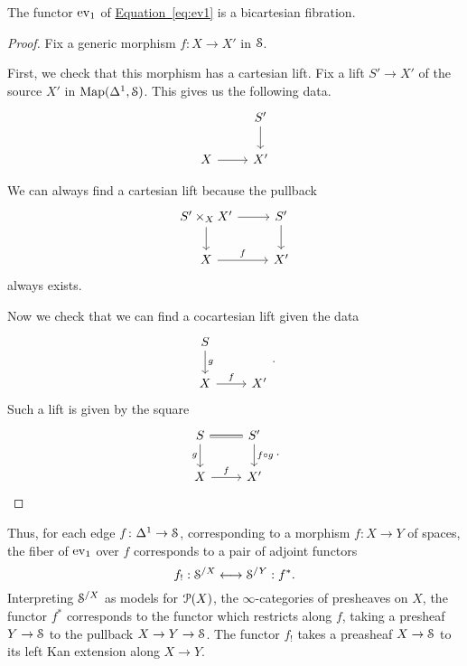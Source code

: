\documentclass[main.tex]{subfiles}
\begin{document}
\begin{corollary}
  The functor $\ev_{1}$ of \hyperref[eq:ev1]{Equation~\ref*{eq:ev1}} is a bicartesian fibration.
\end{corollary}
\begin{proof}
  Fix a generic morphism $f\colon X \to X'$ in $\S$.

  First, we check that this morphism has a cartesian lift. Fix a lift $S' \to X'$ of the source $X'$ in $\Map(\Delta^{1}, \S)$. This gives us the following data.
  \begin{equation*}
    \begin{tikzcd}
      & S'
      \arrow[d]
      \\
      X
      \arrow[r]
      & X'
    \end{tikzcd}
  \end{equation*}

  We can always find a cartesian lift because the pullback
  \begin{equation*}
    \begin{tikzcd}
      S' \times_{X} X'
      \arrow[r]
      \arrow[d]
      & S'
      \arrow[d]
      \\
      X
      \arrow[r, "f"]
      & X'
    \end{tikzcd}
  \end{equation*}
  always exists.

  Now we check that we can find a cocartesian lift given the data
  \begin{equation*}
    \begin{tikzcd}
      S
      \arrow[d, "g"]
      \\
      X
      \arrow[r, "f"]
      & X'
    \end{tikzcd}.
  \end{equation*}
  Such a lift is given by the square
  \begin{equation*}
    \begin{tikzcd}
      S
      \arrow[d, swap, "g"]
      \arrow[r, equals]
      & S'
      \arrow[d, "f \circ g"]
      \\
      X
      \arrow[r, "f"]
      & X'
    \end{tikzcd}.\qedhere
  \end{equation*}
\end{proof}

Thus, for each edge $f\colon \Delta^{1} \to \S$, corresponding to a morphism $f\colon X \to Y$ of spaces, the fiber of $\ev_{1}$ over $f$ corresponds to a pair of adjoint functors
\begin{equation*}
  f_{!} : \S^{/X} \longleftrightarrow \S^{/Y} : f^{*}.
\end{equation*}
Interpreting $\S^{/X}$ as models for $\P(X)$, the $\infty$-categories of presheaves on $X$, the functor $f^{*}$ corresponds to the functor which restricts along $f$, taking a presheaf $Y \to \S$ to the pullback $X \to Y \to \S$. The functor $f_{!}$ takes a preasheaf $X \to \S$ to its left Kan extension along $X \to Y$.
\end{document}
